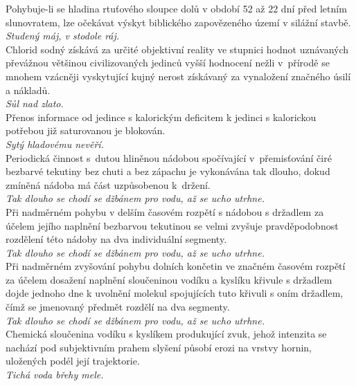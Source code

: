 \begin{multicols}{2}
\noindent
Pohybuje-li se hladina rtuťového sloupce dolů v období 52 až 22
dní před letním slunovratem, lze očekávat výskyt biblického zapovězeného
území v silážní stavbě.\\[1 mm]
{\sl Studený máj, v stodole ráj.}\\

\noindent
Chlorid sodný získává za určité objektivní reality ve stupnici
hodnot uznávaných převážnou většinou civilizovaných jedinců vyšší
hodnocení nežli v~přírodě se mnohem vzácněji vyskytující
kujný nerost získávaný za vynaložení značného úsilí a nákladů.\\[1 mm]
{\sl Sůl nad zlato.}\\

\noindent
Přenos informace od jedince s kalorickým deficitem k jedinci
s kalorickou potřebou již saturovanou je blokován.\\[1 mm]
{\sl Sytý hladovému nevěří.}\\

\noindent
Periodická činnost s~dutou hliněnou nádobou spočívající
v~přemisťování čiré bezbarvé tekutiny bez chuti a bez
zápachu je vykonávána tak dlouho, dokud zmíněná nádoba má část
uzpůsobenou k~držení.\\[1 mm]
{\sl Tak dlouho se chodí se džbánem pro vodu, až se ucho utrhne.}\\

\noindent
Při nadměrném pohybu v delším časovém rozpětí s nádobou s držadlem
za účelem jejího naplnění bezbarvou tekutinou se velmi zvyšuje
pravděpodobnost rozdělení této nádoby na dva individuální segmenty.\\[1 mm]
{\sl Tak dlouho se chodí se džbánem pro vodu, až se ucho utrhne.}\\

\noindent
Při nadměrném zvyšování pohybu dolních končetin ve značném
časovém rozpětí za účelem dosažení naplnění sloučeninou vodíku
a kyslíku křivule s držadlem dojde jednoho dne k uvolnění molekul
spojujících tuto křivuli s oním držadlem, čímž se jmenovaný předmět
rozdělí na dva segmenty.\\[1 mm]
{\sl Tak dlouho se chodí se džbánem pro vodu, až se ucho utrhne.}\\

\noindent
Chemická sloučenina vodíku s kyslíkem produkující zvuk, jehož
intenzita se nachází pod subjektivním prahem slyšení působí erozi
na vrstvy hornin, uložených podél její trajektorie.\\[1 mm]
{\sl Tichá voda břehy mele.}\\


\end{multicols}
